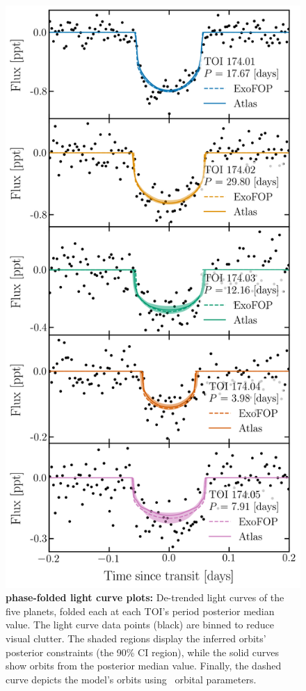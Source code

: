 \documentclass[floatfix,ApJL,twocolumn]{aastex631}
\begin{document}
\begin{figure}\label{fig:phase}
    \centering
    \includegraphics[width=0.9\linewidth]{paper/figures/toi_174_phase.png}
    \caption{\textbf{ phase-folded light curve plots:}
    De-trended light curves of the five  planets, folded each at each TOI's period posterior median value. 
    The light curve data points (black) are binned to reduce visual clutter.
    The shaded regions display the inferred orbits' posterior constraints (the 90\% CI region), while the solid curves show orbits from the posterior median value.
    Finally, the dashed curve depicts the model's orbits using \exofop\ orbital parameters.
    }
\end{figure}
\end{document}
